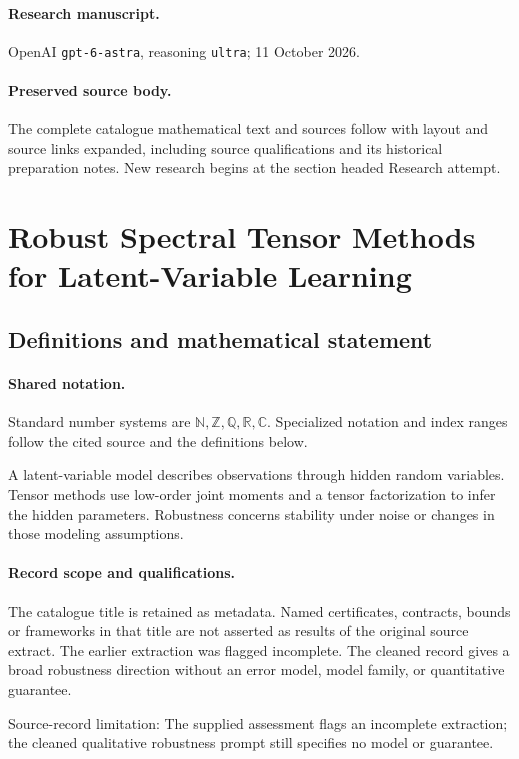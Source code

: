 \documentclass[11pt]{article}
\begin{document}
\paragraph{Research manuscript.} OpenAI \texttt{gpt-6-astra}, reasoning \texttt{ultra}; 11 October 2026.
\paragraph{Preserved source body.} The complete catalogue mathematical text and sources follow with layout and source links expanded, including source qualifications and its historical preparation notes. New research begins at the section headed Research attempt.

\section{Robust Spectral Tensor Methods for Latent-Variable Learning}\label{statement}

\subsection{Definitions and mathematical statement}

\paragraph{Shared notation.}Standard number systems are $\mathbb N,\mathbb Z,\mathbb Q,\mathbb R,\mathbb C$. Specialized notation and index ranges follow the cited source and the definitions below.


A latent-variable model describes observations through hidden random variables. Tensor methods use low-order joint moments and a tensor factorization to infer the hidden parameters. Robustness concerns stability under noise or changes in those modeling assumptions.
\paragraph{Record scope and qualifications.}
The catalogue title is retained as metadata. Named certificates, contracts, bounds or frameworks in that title are not asserted as results of the original source extract.
The earlier extraction was flagged incomplete. The cleaned record gives a broad robustness direction without an error model, model family, or quantitative guarantee.

Source-record limitation: The supplied assessment flags an incomplete extraction; the cleaned qualitative robustness prompt still specifies no model or guarantee.
\end{document}
